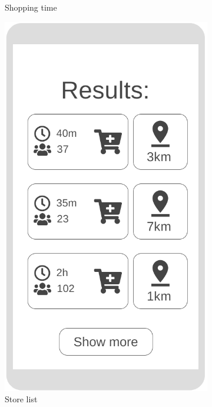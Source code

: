 \begin{figure}[h!]
\begin{subfigure}[b]{0.3\textwidth}
		\caption{Shopping time}
		\label{fig:WfShoppingTime}
	\end{subfigure}
	\hfill
	\begin{subfigure}[b]{0.3\textwidth}
		\includegraphics[width=\linewidth]{../Diagrams/WireframesCLup/QuickTicket.png}
		\caption{Store list}
		\label{fig:WfStoreList}
	\end{subfigure}
	\hfill
	\begin{subfigure}[b]{0.3\textwidth}

\end{subfigure}
\end{figure}
